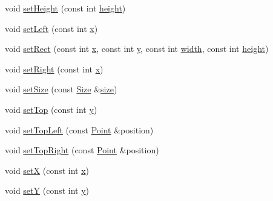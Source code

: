 \begin{DoxyCompactItemize}
\item 
void \hyperlink{classprism_1_1geometry_1_1_rect_a18b0fde32981043ec08f863589e0f8d8}{set\+Height} (const int \hyperlink{classprism_1_1geometry_1_1_rect_afe44f3f138f24808dba2bd807dbbe832}{height})
\item 
void \hyperlink{classprism_1_1geometry_1_1_rect_ac97b8d2c15064a26b6f26833e7001fbe}{set\+Left} (const int \hyperlink{classprism_1_1geometry_1_1_rect_a7ecf0e30c1485b8b6ed1c83625e0ce4c}{x})
\item 
void \hyperlink{classprism_1_1geometry_1_1_rect_a8ae3b5005957a66f52cc3a2809572c62}{set\+Rect} (const int \hyperlink{classprism_1_1geometry_1_1_rect_a7ecf0e30c1485b8b6ed1c83625e0ce4c}{x}, const int \hyperlink{classprism_1_1geometry_1_1_rect_aae87aa965538d7d9ba24050d111fbd0f}{y}, const int \hyperlink{classprism_1_1geometry_1_1_rect_afe228be73477fba4bb5865c23d2761f2}{width}, const int \hyperlink{classprism_1_1geometry_1_1_rect_afe44f3f138f24808dba2bd807dbbe832}{height})
\item 
void \hyperlink{classprism_1_1geometry_1_1_rect_af077efaa0e61445eca6a832dd54daacc}{set\+Right} (const int \hyperlink{classprism_1_1geometry_1_1_rect_a7ecf0e30c1485b8b6ed1c83625e0ce4c}{x})
\item 
void \hyperlink{classprism_1_1geometry_1_1_rect_a21d8240b960c0940dc9bed90466b8bdc}{set\+Size} (const \hyperlink{classprism_1_1geometry_1_1_size}{Size} \&\hyperlink{classprism_1_1geometry_1_1_rect_a5f848db57909f09943fc21fd45a41da2}{size})
\item 
void \hyperlink{classprism_1_1geometry_1_1_rect_a126bf4bdf0581056cc5152c1ad394019}{set\+Top} (const int \hyperlink{classprism_1_1geometry_1_1_rect_aae87aa965538d7d9ba24050d111fbd0f}{y})
\item 
void \hyperlink{classprism_1_1geometry_1_1_rect_a5667e4527098948cb8bc597f43a46b59}{set\+Top\+Left} (const \hyperlink{classprism_1_1geometry_1_1_point}{Point} \&position)
\item 
void \hyperlink{classprism_1_1geometry_1_1_rect_ab9a9908492adcd4fc489ba3c28dfc4ae}{set\+Top\+Right} (const \hyperlink{classprism_1_1geometry_1_1_point}{Point} \&position)
\item 
void \hyperlink{classprism_1_1geometry_1_1_rect_a42106f226ff5487937030da6781dcd4c}{setX} (const int \hyperlink{classprism_1_1geometry_1_1_rect_a7ecf0e30c1485b8b6ed1c83625e0ce4c}{x})
\item 
void \hyperlink{classprism_1_1geometry_1_1_rect_a22ed3d78f25ddef614872e5f39ee102d}{setY} (const int \hyperlink{classprism_1_1geometry_1_1_rect_aae87aa965538d7d9ba24050d111fbd0f}{y})

\end{DoxyCompactItemize}
